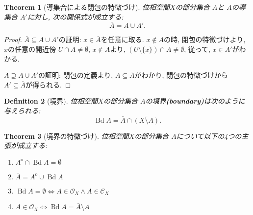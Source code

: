 \documentclass[lualatex]{ltjsbook}
\newcommand{\cl}[1]{\overline{ #1}  }
\newcommand{\Int}[1]{#1 ^{\mathrm{o}} }
\newcommand{\bd}[1]{\operatorname{Bd}{#1}}
\newtheorem{theorem}{Theorem}[chapter]
\newtheorem{definition}[theorem]{Definition}
\theoremstyle{remark}
\theoremstyle{plain}
\begin{document}
\begin{theorem}[導集合による閉包の特徴づけ]
	位相空間$X$の部分集合 $A$と $A$の導集合 $A'$に対し,  次の関係式が成立する:
	\[
	\cl{A} = A \cup A'
	.\] 
\end{theorem}

\begin{proof}
	$\cl{A} \subseteq A \cup A'$の証明:  $x \in \cl{A}$を任意に取る.  
	$x \not\in  A $の時,  閉包の特徴づけより,  $x$の任意の開近傍 $U \cap A \neq \emptyset$,  $x \not\in  A$より,  $\left( U \setminus \{x\}  \right) \cap A \neq \emptyset $,  従って,  $x \in A'$がわかる.

	 $\cl{A} \supseteq A \cup A'$の証明: 閉包の定義より,   $A \subseteq \cl{A}$がわかり,  閉包の特徴づけから $A' \subseteq \cl{A}$が得られる.

\end{proof}

\begin{definition}[境界]
	位相空間$X$の部分集合 $A$の境界\textbf{(boundary)}は次のように与えられる:
	\[
	\bd{A}= \cl{A} \cap \cl{(X\setminus A)}
	.\] 
\end{definition}

\begin{theorem}[境界の特徴づけ]
	位相空間$X$の部分集合 $A$について以下の4つの主張が成立する: 
	 \begin{enumerate}
		\item $\Int{A} \cap \bd{A} = \emptyset$
		\item $\cl{A} = \Int{A} \cup \bd{A}$
		\item  $\bd{A} = \emptyset \iff A \in \mathcal{O}_X \land A \in \mathcal{C}_X$
	\item $A \in \mathcal{O}_X \iff \bd{A} = \cl{A} \setminus A $
	\end{enumerate}
\end{theorem}
\end{document}
